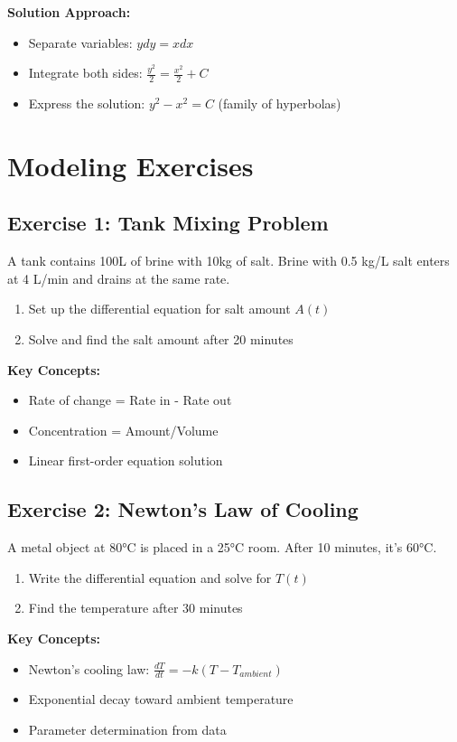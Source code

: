 \documentclass[12pt, letterpaper]{book}
\theoremstyle{problemstyle}
\theoremstyle{solutionstyle}
\begin{document}
\textbf{Solution Approach:}
\begin{itemize}
    \item Separate variables: $y dy = x dx$
    \item Integrate both sides: $\frac{y^2}{2} = \frac{x^2}{2} + C$
    \item Express the solution: $y^2 - x^2 = C$ (family of hyperbolas)
\end{itemize}

\section{Modeling Exercises}

\subsection{Exercise 1: Tank Mixing Problem}
A tank contains 100L of brine with 10kg of salt. Brine with 0.5 kg/L salt enters at 4 L/min and drains at the same rate.
\begin{enumerate}
    \item Set up the differential equation for salt amount $A(t)$
    \item Solve and find the salt amount after 20 minutes
\end{enumerate}

\textbf{Key Concepts:}
\begin{itemize}
    \item Rate of change = Rate in - Rate out
    \item Concentration = Amount/Volume
    \item Linear first-order equation solution
\end{itemize}

\subsection{Exercise 2: Newton's Law of Cooling}
A metal object at 80°C is placed in a 25°C room. After 10 minutes, it's 60°C.
\begin{enumerate}
    \item Write the differential equation and solve for $T(t)$
    \item Find the temperature after 30 minutes
\end{enumerate}

\textbf{Key Concepts:}
\begin{itemize}
    \item Newton's cooling law: $\frac{dT}{dt} = -k(T - T_{ambient})$
    \item Exponential decay toward ambient temperature
    \item Parameter determination from data
\end{itemize}
\end{document}
